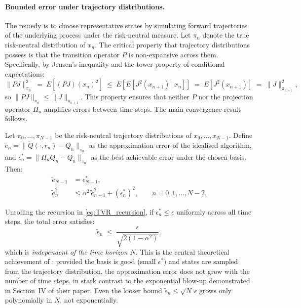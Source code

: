 \paragraph{Bounded error under trajectory distributions.}
The remedy is to choose representative states by simulating forward
trajectories of the underlying process under the risk-neutral measure.
Let $\pi_n$ denote the true risk-neutral distribution of $x_n$. The
critical property that trajectory distributions possess is that the
transition operator $P$ is non-expansive across them. Specifically, by
Jensen's inequality and the tower property of conditional expectations:
\begin{equation}
    \|PJ\|_{\pi_n}^2
    \;=\; E\!\left[(PJ)(x_n)^2\right]
    \;\leq\; E\!\left[E\!\left[J^2(x_{n+1})\,\big|\,x_n\right]\right]
    \;=\; E\!\left[J^2(x_{n+1})\right]
    \;=\; \|J\|_{\pi_{n+1}}^2,
    \label{eq:TVR_nonexpansion}
\end{equation}
so $\|PJ\|_{\pi_n} \leq \|J\|_{\pi_{n+1}}$. This property ensures that
neither $P$ nor the projection operator $\Pi_n$ amplifies errors between
time steps. The main convergence result follows.

\begin{theorem}
\label{thm:TVR_theorem1}
Let $\pi_0, \ldots, \pi_{N-1}$ be the risk-neutral trajectory
distributions of $x_0, \ldots, x_{N-1}$. Define
$\tilde{e}_n = \|\tilde{Q}(\cdot, r_n) - Q_n\|_{\pi_n}$ as the
approximation error of the idealised algorithm, and
$\epsilon_n^* = \|\Pi_n Q_n - Q_n\|_{\pi_n}$ as the best achievable
error under the chosen basis. Then:
\begin{align}
    \tilde{e}_{N-1} &= \epsilon_{N-1}^*, \label{eq:TVR_init}\\
    \tilde{e}_n^2   &\leq \alpha^2\, \tilde{e}_{n+1}^2
                         + \left(\epsilon_n^*\right)^2,
    \qquad n = 0, 1, \ldots, N-2. \label{eq:TVR_recursion}
\end{align}
\end{theorem}

Unrolling the recursion in \eqref{eq:TVR_recursion}, if $\epsilon_n^* \leq
\epsilon$ uniformly across all time steps, the total error satisfies:
\begin{equation}
    \tilde{e}_n \;\leq\; \frac{\epsilon}{\sqrt{2(1 - \alpha^2)}},
    \label{eq:TVR_uniform_bound}
\end{equation}
which is \emph{independent of the time horizon $N$}. This is the central
theoretical achievement of \citet{tsitsiklis2001}: provided the basis is
good (small $\epsilon^*$) and states are sampled from the trajectory
distribution, the approximation error does not grow with the number of
time steps, in stark contrast to the exponential blow-up demonstrated in
Section~IV of their paper. Even the looser bound $\tilde{e}_n \leq
\sqrt{N}\,\epsilon$ grows only polynomially in $N$, not exponentially.

